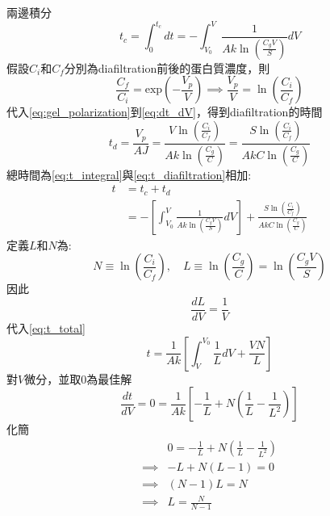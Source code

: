 ﻿\documentclass[12pt,a4paper]{article}
\begin{document}
\begin{problems}
兩邊積分
\begin{equation}
  t_c = \int_0^{t_c} dt = -\int_{V_0}^{V} \frac{1}{Ak\ln\left(\frac{C_gV}{S}\right)}dV \label{eq:t_integral}
\end{equation}
假設$C_i$和$C_f$分別為diafiltration前後的蛋白質濃度，則
\begin{equation}
  \frac{C_f}{C_i} = \text{exp}\left(-\frac{V_p}{V}\right) \implies \frac{V_p}{V} = \ln\left(\frac{C_i}{C_f}\right)
\end{equation}
代入\eqref{eq:gel_polarization}到\eqref{eq:dt_dV}，得到diafiltration的時間
\begin{equation}
 t_d = \frac{V_p}{AJ} = \frac{V \ln\left(\frac{C_i}{C_f}\right)}{Ak \ln\left(\frac{C_g}{C}\right)} = 
 \frac{S \ln\left(\frac{C_i}{C_f}\right)}{Ak C \ln\left(\frac{C_g}{C}\right)} \label{eq:t_diafiltration}
\end{equation}
總時間為\eqref{eq:t_integral}與\eqref{eq:t_diafiltration}相加:
\begin{align}
  t &= t_c + t_d \nonumber\\
  &=- \left[\int_{V_0}^{V} \frac{1}{Ak\ln\left(\frac{C_gV}{S}\right)}dV\right] 
  + \frac{S \ln\left(\frac{C_i}{C_f}\right)}{Ak C \ln\left(\frac{C_g}{C}\right)} \label{eq:t_total}
\end{align}
定義$L$和$N$為:
\begin{equation}
  N \equiv \ln\left(\frac{C_i}{C_f}\right),\quad
  L \equiv \ln\left(\frac{C_g}{C}\right) = \ln\left(\frac{C_gV}{S}\right)
\end{equation}
因此
\begin{equation}
  \frac{dL}{dV} = \frac{1}{V}
\end{equation}
代入\eqref{eq:t_total}
\begin{equation}
  t = \frac{1}{Ak} \left[
    \int_V^{V_0} \frac{1}{L}dV + \frac{VN}{L}
  \right]
\end{equation}
對$V$微分，並取0為最佳解
\begin{equation}
  \frac{dt}{dV}  = 0 = \frac{1}{Ak}\left[
    -\frac{1}{L} + N \left(
      \frac{1}{L} - \frac{1}{L^2}
    \right)
  \right]
\end{equation}
化簡
\begin{align}
  &0 = -\frac{1}{L} + N \left(
    \frac{1}{L} - \frac{1}{L^2}
  \right) \nonumber\\
  \implies& -L + N(L-1) = 0 \nonumber\\
  \implies& (N-1)L = N \nonumber\\
  \implies& L = \frac{N}{N-1} \label{eq:L_optimal}
\end{align}

\end{problems}
\end{document}
